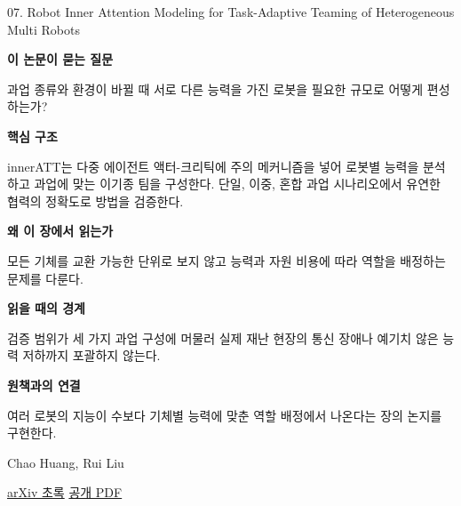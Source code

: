 \documentclass[11pt,openany]{book}
\begin{document}
\begin{termcard}{07. Robot Inner Attention Modeling for Task-Adaptive Teaming of Heterogeneous Multi Robots}

\par

\medskip

{\sffamily\bfseries\color{deepblue} 이 논문이 묻는 질문}\par

과업 종류와 환경이 바뀔 때 서로 다른 능력을 가진 로봇을 필요한 규모로 어떻게 편성하는가?

\smallskip

{\sffamily\bfseries\color{deepblue} 핵심 구조}\par

innerATT는 다중 에이전트 액터-크리틱에 주의 메커니즘을 넣어 로봇별 능력을 분석하고 과업에 맞는 이기종 팀을 구성한다. 단일, 이중, 혼합 과업 시나리오에서 유연한 협력의 정확도로 방법을 검증한다.

\smallskip

{\sffamily\bfseries\color{deepblue} 왜 이 장에서 읽는가}\par

모든 기체를 교환 가능한 단위로 보지 않고 능력과 자원 비용에 따라 역할을 배정하는 문제를 다룬다.

\smallskip

{\sffamily\bfseries\color{coral} 읽을 때의 경계}\par

검증 범위가 세 가지 과업 구성에 머물러 실제 재난 현장의 통신 장애나 예기치 않은 능력 저하까지 포괄하지 않는다.

\smallskip

{\sffamily\bfseries\color{teal} 원책과의 연결}\par

여러 로봇의 지능이 수보다 기체별 능력에 맞춘 역할 배정에서 나온다는 장의 논지를 구현한다.

\medskip

{\footnotesize\color{muted} Chao Huang, Rui Liu\par

\href{https://arxiv.org/abs/2006.15482}{arXiv 초록} \quad \href{https://arxiv.org/pdf/2006.15482}{공개 PDF}\par}

\end{termcard}
\end{document}
